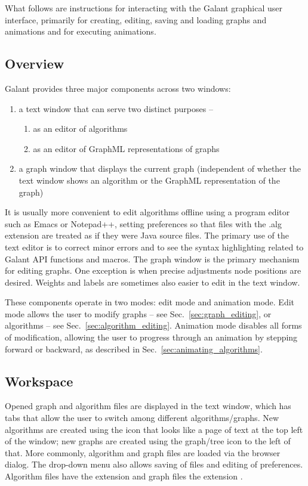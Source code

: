 
What follows are instructions for interacting with the Galant graphical user
interface, primarily for creating, editing, saving and loading graphs and
animations and for executing animations.

\subsection{Overview}

Galant provides three major components across two windows:
\begin{enumerate}
\item
a text window that can serve two distinct purposes --
\begin{enumerate}
\item as an editor of algorithms
\item as an editor of GraphML representations of graphs
\end{enumerate}
\item
a graph window that displays the current graph (independent of whether
the text window shows an algorithm or the GraphML representation of the graph)
\end{enumerate}

It is usually more convenient to edit algorithms
offline using a program editor such as Emacs or Notepad++, setting
preferences so that files with the .alg extension are treated as if they were
Java source files.
The primary use of the text editor is to correct minor errors and
to see the syntax highlighting related to Galant API functions and macros.
The graph window is the primary mechanism for editing graphs.
One exception is when precise adjustments node positions are desired.
Weights and labels are sometimes also easier to edit in the text window.



These components operate in two modes: edit mode and animation mode.
Edit mode allows the user to modify graphs -- see Sec.~\ref{sec:graph_editing},
or algorithms -- see Sec.~\ref{sec:algorithm_editing}. Animation mode disables all forms of modification, allowing the user to progress through
an animation by stepping forward or backward, as described in
Sec.~\ref{sec:animating_algorithms}.

\subsection{Workspace}

Opened graph and algorithm files are displayed in the text window, which has
tabs that allow the user to switch among different algorithms/graphs.  New
algorithms are created using the icon that looks like a page of text at the
top left of the window; new graphs are created using the graph/tree icon to
the left of that.  More commonly, algorithm and graph files are loaded via
the  browser dialog. The  drop-down
menu also allows saving of files and editing of preferences. Algorithm files
have the extension  and graph files the extension .

